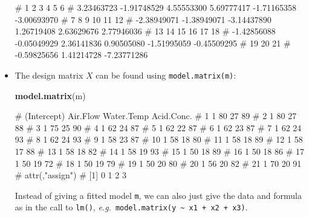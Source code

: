 \documentclass[
  a4paper,
]{article}
\newenvironment{Shaded}{\begin{snugshade}}{\end{snugshade}}
\newcommand{\FunctionTok}[1]{\textcolor[rgb]{0.13,0.29,0.53}{\textbf{#1}}}
\newcommand{\NormalTok}[1]{#1}
\theoremstyle{definition}
\theoremstyle{definition}
\theoremstyle{definition}
\theoremstyle{definition}
\theoremstyle{remark}
\begin{document}
\begin{itemize}
\begin{Shaded}
\begin{Highlighting}[]
\NormalTok{\#           1           2           3           4           5           6 }
\NormalTok{\#  3.23463723 {-}1.91748529  4.55553300  5.69777417 {-}1.71165358 {-}3.00693970 }
\NormalTok{\#           7           8           9          10          11          12 }
\NormalTok{\# {-}2.38949071 {-}1.38949071 {-}3.14437890  1.26719408  2.63629676  2.77946036 }
\NormalTok{\#          13          14          15          16          17          18 }
\NormalTok{\# {-}1.42856088 {-}0.05049929  2.36141836  0.90505080 {-}1.51995059 {-}0.45509295 }
\NormalTok{\#          19          20          21 }
\NormalTok{\# {-}0.59825656  1.41214728 {-}7.23771286}
\end{Highlighting}
\end{Shaded}
\item
  The design matrix \(X\) can be found using \texttt{model.matrix(m)}:

\begin{Shaded}
\begin{Highlighting}[]
  \FunctionTok{model.matrix}\NormalTok{(m)}
\end{Highlighting}
\end{Shaded}

\begin{Shaded}
\begin{Highlighting}[]
\NormalTok{\#    (Intercept) Air.Flow Water.Temp Acid.Conc.}
\NormalTok{\# 1            1       80         27         89}
\NormalTok{\# 2            1       80         27         88}
\NormalTok{\# 3            1       75         25         90}
\NormalTok{\# 4            1       62         24         87}
\NormalTok{\# 5            1       62         22         87}
\NormalTok{\# 6            1       62         23         87}
\NormalTok{\# 7            1       62         24         93}
\NormalTok{\# 8            1       62         24         93}
\NormalTok{\# 9            1       58         23         87}
\NormalTok{\# 10           1       58         18         80}
\NormalTok{\# 11           1       58         18         89}
\NormalTok{\# 12           1       58         17         88}
\NormalTok{\# 13           1       58         18         82}
\NormalTok{\# 14           1       58         19         93}
\NormalTok{\# 15           1       50         18         89}
\NormalTok{\# 16           1       50         18         86}
\NormalTok{\# 17           1       50         19         72}
\NormalTok{\# 18           1       50         19         79}
\NormalTok{\# 19           1       50         20         80}
\NormalTok{\# 20           1       56         20         82}
\NormalTok{\# 21           1       70         20         91}
\NormalTok{\# attr(,"assign")}
\NormalTok{\# [1] 0 1 2 3}
\end{Highlighting}
\end{Shaded}

  Instead of giving a fitted model \texttt{m}, we can also just give the
  data and formula as in the call to \texttt{lm()},
  \emph{e.g.}~\texttt{model.matrix(y\ \textasciitilde{}\ x1\ +\ x2\ +\ x3)}.
\end{itemize}
\end{document}
